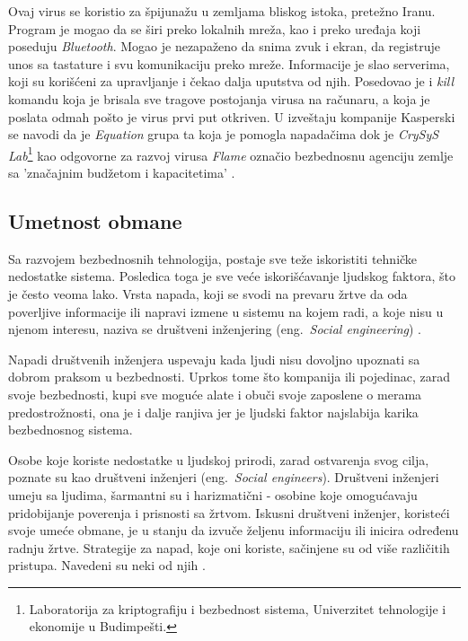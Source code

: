 \documentclass[a4paper]{article}
\begin{document}
Ovaj virus se koristio za špijunažu u zemljama bliskog istoka, pretežno Iranu. Program je mogao da se širi preko lokalnih mreža, kao i preko uređaja koji poseduju {\em Bluetooth}. Mogao je nezapaženo da snima zvuk i ekran, da registruje unos sa tastature i svu komunikaciju preko mreže. Informacije je slao serverima, koji su korišćeni za upravljanje i čekao dalja uputstva od njih. Posedovao je i \textit{kill} komandu koja je brisala sve tragove postojanja virusa na računaru, a koja je poslata odmah pošto je virus prvi put otkriven. U izveštaju kompanije Kasperski se navodi da je \textit{Equation} grupa ta koja je pomogla napadačima dok je \textit{CrySyS Lab}\footnote{ Laboratorija za kriptografiju i bezbednost sistema, Univerzitet tehnologije i ekonomije u Budimpešti.} kao odgovorne za razvoj virusa \textit{Flame} označio bezbednosnu agenciju zemlje sa 'značajnim budžetom i kapacitetima' \cite{flame}.

\subsection{Umetnost obmane}
\label{deception}

Sa razvojem bezbednosnih tehnologija, postaje sve teže
iskoristiti tehničke nedostatke sistema.
Posledica toga je sve veće iskorišćavanje ljudskog
faktora, što je često veoma lako. Vrsta napada, koji se
svodi na prevaru žrtve da oda poverljive informacije ili
napravi izmene u sistemu na kojem radi, a koje nisu u
njenom interesu, naziva se društveni inženjering
(eng.~{\em Social engineering}) \cite{deception}.

Napadi društvenih inženjera uspevaju kada ljudi nisu dovoljno upoznati sa dobrom praksom u bezbednosti. Uprkos tome što kompanija ili pojedinac, zarad svoje bezbednosti, kupi sve moguće alate i obuči svoje zaposlene o merama predostrožnosti, ona je i dalje ranjiva jer je ljudski faktor najslabija karika bezbednosnog sistema.

Osobe koje koriste nedostatke u ljudskoj prirodi, zarad ostvarenja svog cilja, poznate su kao društveni inženjeri (eng.~{\em Social engineers}). Društveni inženjeri umeju sa ljudima, šarmantni su i harizmatični - osobine koje omogućavaju pridobijanje poverenja i prisnosti sa žrtvom. Iskusni društveni inženjer, koristeći svoje umeće obmane, je u stanju da izvuče željenu informaciju ili inicira određenu radnju žrtve. Strategije za napad, koje oni koriste, sačinjene su od više različitih pristupa. Navedeni su neki od njih \cite{deception}.
\end{document}
